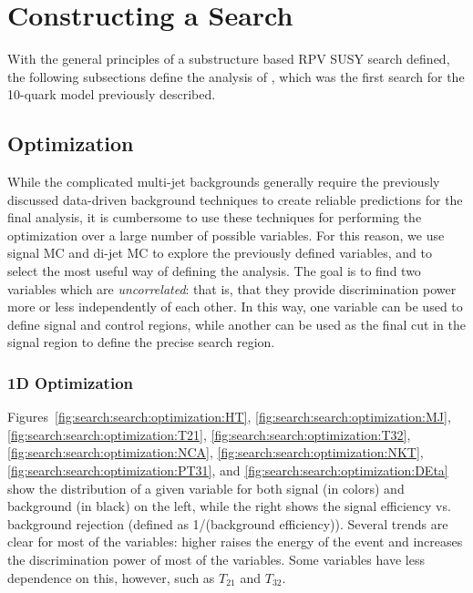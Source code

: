 \section{Constructing a Search}

With the general principles of a substructure based RPV SUSY search defined, the following subsections define the analysis of \cite{RPVSUSY}, which was the first search for the 10-quark model previously described.

\label{chapter:search:search}
\subsection{Optimization}

While the complicated multi-jet backgrounds generally require the previously discussed data-driven background techniques to create reliable predictions for the final analysis, it is cumbersome to use these techniques for performing the optimization over a large number of possible variables. For this reason, we use signal MC and \herwigpp di-jet MC to explore the previously defined variables, and to select the most useful way of defining the analysis. The goal is to find two variables which are \textit{uncorrelated}: that is, that they provide discrimination power more or less independently of each other. In this way, one variable can be used to define signal and control regions, while another can be used as the final cut in the signal region to define the precise search region.

\subsubsection{1D Optimization}

Figures~\ref{fig:search:search:optimization:HT}, \ref{fig:search:search:optimization:MJ}, \ref{fig:search:search:optimization:T21}, \ref{fig:search:search:optimization:T32}, \ref{fig:search:search:optimization:NCA}, \ref{fig:search:search:optimization:NKT}, \ref{fig:search:search:optimization:PT31}, and \ref{fig:search:search:optimization:DEta} show the distribution of a given variable for both signal (in colors) and background (in black) on the left, while the right shows the signal efficiency vs. background rejection (defined as 1/(background efficiency)). Several trends are clear for most of the variables: higher \mgluino raises the energy of the event and increases the discrimination power of most of the variables. Some variables have less dependence on this, however, such as $T_{21}$ and $T_{32}$.

